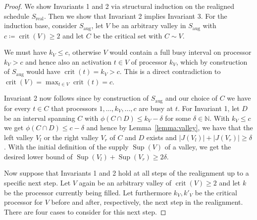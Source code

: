 \documentclass[a4paper]{article}
\DeclareMathOperator{\aug}{aug}
\DeclareMathOperator{\real}{real}
\DeclareMathOperator{\crit}{crit}
\DeclareMathOperator{\fillop}{fill}
\DeclareMathOperator{\res}{Sup}
\begin{document}
\begin{proof}
  We show Invariants 1 and 2 via structural induction on the realigned schedule $S_{\real}$.
  Then we show that Invariant 2 implies Invariant 3.
  For the induction base, consider $S_{\aug}$, let $V$ be an arbitrary valley in $S_{\aug}$ with $c \coloneqq \crit(V) \geq 2$ and let $C$ be the critical set with $C \sim V$.

  We must have $k_V \leq c$, otherwise $V$ would contain a full busy interval on processor $k_V > c$ and hence also an activation $t \in V$ of processor $k_V$, which by construction of $S_{\aug}$ would have $\crit(t) = k_V > c$.
  This is a direct contradiction to $\crit(V) = \max_{t \in V} \crit(t) = c$.

  Invariant 2 now follows since by construction of $S_{\aug}$ and our choice of $C$ we have for every $t \in C$ that processors $1, \ldots, k_V, \ldots, c$ are busy at $t$. For Invariant 1, let $D$ be an interval spanning $C$ with $\phi(C \cap D) \leq k_V - \delta$ for some $\delta \in \mathbb{N}$.
  With $k_V \leq c$ we get $\phi(C \cap D) \leq c - \delta$ and hence by Lemma~\ref{lemma:valley}, we have that the left valley $V_l$ or the right valley $V_r$ of $C$ and $D$ exists and $|J(V_l)| + |J(V_r)| \geq \delta$.
  With the initial definition of the supply $\res(V)$ of a valley, we get the desired lower bound of $\res(V_l) + \res(V_r) \geq 2 \delta$.

  Now suppose that Invariants 1 and 2 hold at all steps of the realignment up to a specific next step.
  Let $V$ again be an arbitrary valley of $\crit(V) \geq 2$ and let $k$ be the processor currently being filled.
  Let furthermore $k_V, k'_V$ be the critical processor for $V$ before and after, respectively, the next step in the realignment.
  There are four cases to consider for this next step.


\end{proof}
\end{document}
